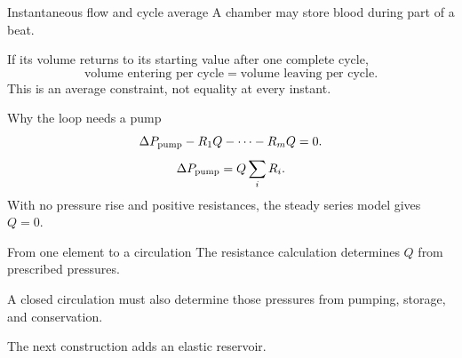 \documentclass[aspectratio=169,11pt]{beamer}
\newcommand{\notestarget}{notes.pdf}\newcommand{\noteslabel}{Notes}
\begin{document}
\renewcommand{\notestarget}{notes.pdf\#note-conservation-begins-with-a-chosen-boundary}
\begin{frame}[t,fragile,label=slide-instantaneous-flow-and-cycle-average]{Instantaneous flow and cycle average}
A chamber may store blood during part of a beat.\pause{}\par If its volume returns to its starting value after one complete cycle,\[\text{volume entering per cycle}=\text{volume leaving per cycle}.\]\pause{} This is an average constraint, not equality at every instant.
\end{frame}
\renewcommand{\notestarget}{notes.pdf\#note-pressure-rise-supplied-by-the-pump}
\begin{frame}[t,fragile,label=slide-why-the-loop-needs-a-pump]{Why the loop needs a pump}
\[\Delta P_{\rm pump}-R_1Q-\cdots-R_mQ=0.\]\pause{}\[\Delta P_{\rm pump}=Q\sum_iR_i.\]\pause{} With no pressure rise and positive resistances, the steady series model gives $Q=0$.
\end{frame}
\renewcommand{\notestarget}{notes.pdf\#note-pressure-rise-supplied-by-the-pump}
\begin{frame}[t,fragile,label=slide-from-one-element-to-a-circulation]{From one element to a circulation}
The resistance calculation determines $Q$ from prescribed pressures.\pause{}\par A closed circulation must also determine those pressures from pumping, storage, and conservation.\pause{}\par The next construction adds an elastic reservoir.
\end{frame}
\end{document}
